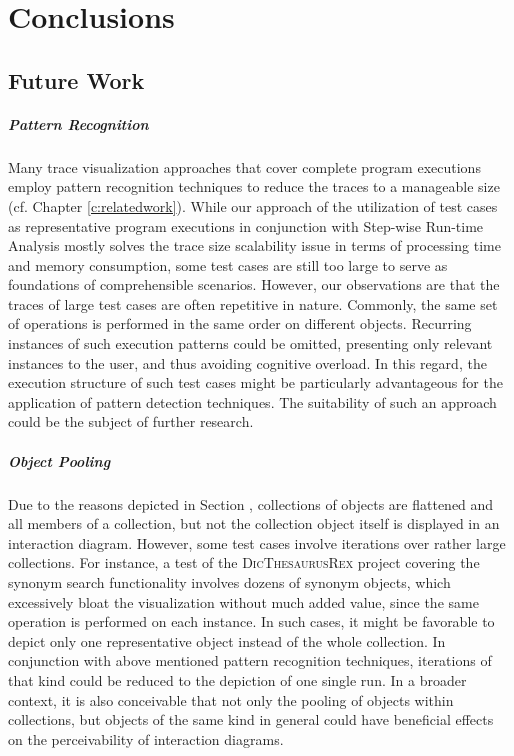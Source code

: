 \chapter{Conclusions}
\label{c:conclusions}

\section{Future Work}
\label{s:ConclusionsFuture}


\paragraph{Pattern Recognition} Many trace visualization approaches that cover complete program executions employ pattern recognition techniques to reduce the traces to a manageable size (cf. Chapter \ref{c:relatedwork}).
While our approach of the utilization of test cases as representative program executions in conjunction with Step-wise Run-time Analysis mostly solves the trace size scalability issue in terms of processing time and memory consumption, some test cases are still too large to serve as foundations of comprehensible scenarios.
However, our observations are that the traces of large test cases are often repetitive in nature. Commonly, the same set of operations is performed in the same order on different objects.
Recurring instances of such execution patterns could be omitted, presenting only relevant instances to the user, and thus avoiding cognitive overload.
In this regard, the execution structure of such test cases might be particularly advantageous for the application of pattern detection techniques.
The suitability of such an approach could be the subject of further research.

\paragraph{Object Pooling} Due to the reasons depicted in Section , collections of objects are flattened and all members of a collection, but not the collection object itself is displayed in an interaction diagram. However, some test cases involve iterations over rather large collections.
For instance, a test of the \textsc{DicThesaurusRex} project covering the synonym search functionality involves dozens of synonym objects, which excessively bloat the visualization without much added value, since the same operation is performed on each instance.
In such cases, it might be favorable to depict only one representative object instead of the whole collection.
In conjunction with above mentioned pattern recognition techniques, iterations of that kind could be reduced to the depiction of one single run.
In a broader context, it is also conceivable that not only the pooling of objects within collections, but objects of the same kind in general could have beneficial effects on the perceivability of interaction diagrams.

